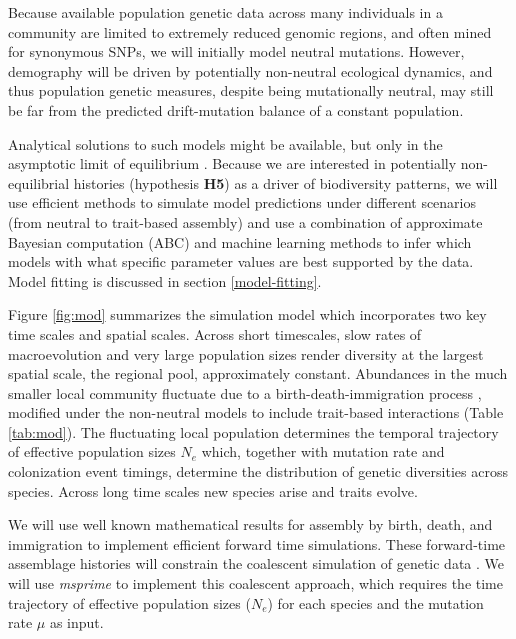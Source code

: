 \documentclass[11pt]{article}
\begin{document}
Because available population genetic data across many individuals in a
community are limited to extremely reduced genomic regions, and often
mined for synonymous SNPs, we will initially model neutral mutations.
However, demography will be driven by potentially non-neutral
ecological dynamics, and thus population genetic measures, despite
being mutationally neutral, may still be far from the predicted
drift-mutation balance of a constant population.

Analytical solutions to such models might be available, but only in
the asymptotic limit of equilibrium \citep[e.g.,][]{Etienne2007-we,
  Rosindell2015-gp}. Because we are interested in potentially
non-equilibrial histories (hypothesis \textbf{H5}) as a driver of
biodiversity patterns, we will use efficient methods to simulate model
predictions under different scenarios (from neutral to trait-based
assembly) and use a combination of approximate Bayesian computation
(ABC) and machine learning methods to infer which models with what
specific parameter values are best supported by the data. Model
fitting is discussed in section \ref{model-fitting}.

Figure \ref{fig:mod} summarizes the simulation model which
incorporates two key time scales and spatial scales. Across short
timescales, slow rates of macroevolution and very large population
sizes render diversity at the largest spatial scale, the regional
pool, approximately constant. Abundances in the much smaller local
community fluctuate due to a birth-death-immigration process
\cite{Kendall1948-ri}, modified under the non-neutral models to
include trait-based interactions (Table \ref{tab:mod}).  The
fluctuating local population determines the temporal trajectory of
effective population sizes $N_e$ \cite{waples2007} which, together
with mutation rate and colonization event timings, determine the
distribution of genetic diversities across species. Across long time
scales new species arise and traits evolve.

We will use well known mathematical results for assembly by birth,
death, and immigration \cite{Haegeman2017-kf,Kendall1948-ri} to
implement efficient forward time simulations.  These forward-time
assemblage histories will constrain the coalescent simulation of
genetic data \cite{Rosenberg2002-vb, waples2007}. We will use {\it
  msprime} \cite{Kelleher2016-an} to implement this coalescent
approach, which requires the time trajectory of effective population
sizes ($N_e$) for each species and the mutation rate $\mu$ as input.
\end{document}
